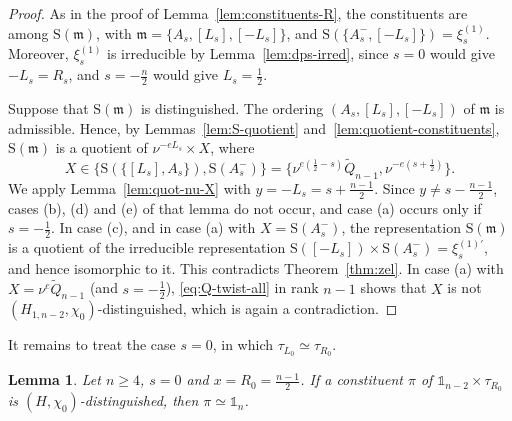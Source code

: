 \documentclass[11pt]{amsart}
\numberwithin{equation}{section}
\theoremstyle{plain}
\newtheorem{lemma}[theorem]{Lemma}
\theoremstyle{definition}
\theoremstyle{remark}
\newcommand{\one}{\mathds{1}}
\newcommand{\Qt}{\widetilde{Q}}
\newcommand{\xione}{\xi^{(1)}}
\newcommand{\mm}{\mathfrak{m}}
\newcommand{\Ss}{\mathrm{S}}
\begin{document}
\begin{proof}
	As in the proof of Lemma~\ref{lem:constituents-R}, the constituents are among $\Ss(\mm)$, with $\mm=\{A_s,[L_s],[-L_s]\}$, and $\Ss(\{A_s^-,[-L_s]\})=\xione_s$. Moreover, $\xione_s$ is irreducible by Lemma~\ref{lem:dps-irred}, since $s=0$ would give $-L_s=R_s$, and $s=-\frac n2$ would give $L_s=\frac12$.
	
	Suppose that $\Ss(\mm)$ is distinguished. The ordering $(A_s,[L_s],[-L_s])$ of $\mm$ is admissible. Hence, by Lemmas~\ref{lem:S-quotient} and~\ref{lem:quotient-constituents}, $\Ss(\mm)$ is a quotient of $\nu^{-eL_s}\times X$, where
	$$X\in\{\Ss(\{[L_s],A_s\}),\Ss(A_s^-)\}=\{\nu^{e(\frac12-s)}\Qt_{n-1},\nu^{-e(s+\frac12)}\}.$$
	We apply Lemma~\ref{lem:quot-nu-X} with $y=-L_s=s+\frac{n-1}2$. Since $y\ne s-\frac{n-1}2$, cases (b), (d) and (e) of that lemma do not occur, and case (a) occurs only if $s=-\frac12$. In case (c), and in case (a) with $X=\Ss(A_s^-)$, the representation $\Ss(\mm)$ is a quotient of the irreducible representation $\Ss([-L_s])\times\Ss(A_s^-)=\xi^{(1)\prime}_s$, and hence isomorphic to it. This contradicts Theorem~\ref{thm:zel}. In case (a) with $X=\nu^{e}\Qt_{n-1}$ (and $s=-\frac12$), \eqref{eq:Q-twist-all} in rank $n-1$ shows that $X$ is not $(H_{1,n-2},\chi_0)$-distinguished, which is again a contradiction.
\end{proof}

It remains to treat the case $s=0$, in which $\tau_{L_0}\simeq\tau_{R_0}$.

\begin{lemma}\label{lem:constituents-s0}
	Let $n\ge4$, $s=0$ and $x=R_0=\frac{n-1}2$. If a constituent $\pi$ of $\one_{n-2}\times\tau_{R_0}$ is $(H,\chi_0)$-distinguished, then $\pi\simeq\one_n$.
\end{lemma}
\end{document}
